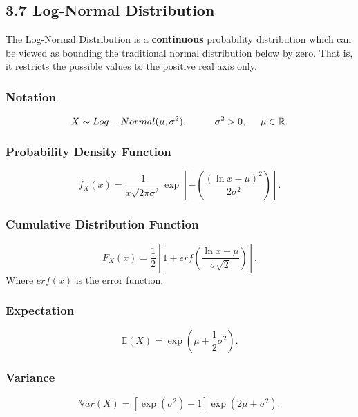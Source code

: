 \documentclass[11pt]{article}
\begin{document}
\subsection*{3.7 Log-Normal Distribution}
The Log-Normal Distribution is a \textbf{continuous} probability distribution which can be viewed as bounding the traditional normal distribution below by zero. That is, it restricts the possible values to the positive real axis only. 

\subsubsection*{Notation}
\begin{equation}
    X \sim Log-Normal(\mu, \sigma^2), \hspace{1cm} \sigma^2 >0, \hspace{0.5cm} \mu \in \mathbb{R}.
\end{equation}

\subsubsection*{Probability Density Function}
\begin{equation}
    f_X(x) = \frac{1}{x \sqrt{2 \pi \sigma^2}} \exp \left[ -\left( \frac{(\ln x - \mu)^2}{2 \sigma^2}\right) \right].
\end{equation}

\subsubsection*{Cumulative Distribution Function}
\begin{equation}
    F_X(x) = \frac{1}{2}\left[ 1 + erf \left( \frac{\ln x - \mu}{\sigma \sqrt{2}}\right)  \right].
\end{equation}
Where $erf(x)$ is the error function.

\subsubsection*{Expectation}
\begin{equation}
    \mathbb{E}(X) = \exp \left(\mu + \frac{1}{2} \sigma^2 \right).
\end{equation}

\subsubsection*{Variance}
\begin{equation}
    \mathbb{V}ar(X) = [\exp(\sigma^2) - 1] \exp(2\mu + \sigma^2).
\end{equation}
\end{document}
